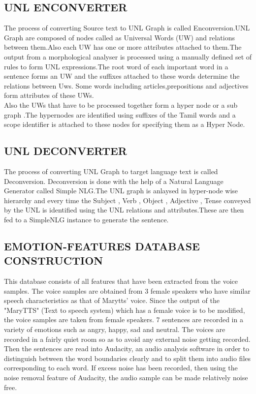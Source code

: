 \documentclass{article}
\begin{document}
\subsection{UNL ENCONVERTER}
The process of converting Source text to UNL Graph is called Enconversion.UNL Graph are composed of nodes called as Universal Words (UW) and relations between them.Also each UW has one or more attributes attached to them.The output from a morphological analyser is processed using a manually defined set of rules to form UNL expressions.The root word of each important word in a sentence forms an UW and the suffixes attached to these words determine the relations between Uws. Some words including articles,prepositions and adjectives form attributes of these UWs.
\\Also the UWs that have to be processed together form a hyper node or a sub graph .The hypernodes are identified using suffixes of the Tamil words and a scope identifier is attached to these nodes for specifying them as a Hyper Node.

\subsection{UNL DECONVERTER}
The process of converting UNL Graph to target language text is called Deconversion. Deconversion is done with the help of a Natural Language Generator called Simple NLG.The UNL graph is anlaysed in hyper-node wise hierarchy and every time the Subject , Verb , Object , Adjective , Tense conveyed by the UNL is identified using the UNL relations and attributes.These are then fed to a SimpleNLG instance to generate the sentence.

\subsection{EMOTION-FEATURES DATABASE CONSTRUCTION}
This database consists of all features that have been extracted from the voice samples. The voice samples are obtained from 3 female speakers who have similar speech characteristics as that of Marytts' voice.  Since the output of the "MaryTTS" (Text to speech system) which has a female voice is to be modified, the voice samples are taken from female speakers. 7 sentences are recorded in a variety of emotions such as angry, happy, sad and neutral.  The voices are recorded in a fairly quiet room so as to avoid any external noise getting recorded. Then the sentences are read into Audacity, an audio analysis software in order to distinguish between the word boundaries clearly and to split them into audio files corresponding to each word. If excess noise has been recorded, then using the noise removal feature of Audacity, the audio sample can be made relatively noise free.\\
\end{document}
